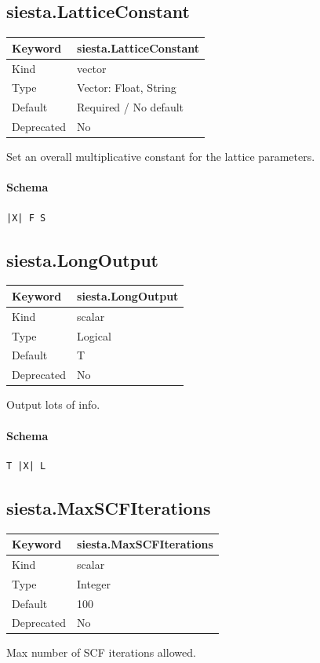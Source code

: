 \documentclass[11pt]{article}
\begin{document}
{{{{{\subsection{siesta.LatticeConstant}
\label{kw:siesta-LatticeConstant}
\begin{longtable}{|p{1.5in}|p{4.5in}|}
\hline
Keyword & siesta.LatticeConstant \\
\hline
Kind & vector \\
\hline
Type & Vector: Float, String \\
\hline
Default & Required / No default \\
\hline
Deprecated & No \\
\hline
\end{longtable}
 Set an overall multiplicative constant for the lattice parameters.

\paragraph{Schema}
\begin{Verbatim}
|X| F S
\end{Verbatim}

\subsection{siesta.LongOutput}
\label{kw:siesta-LongOutput}
\begin{longtable}{|p{1.5in}|p{4.5in}|}
\hline
Keyword & siesta.LongOutput \\
\hline
Kind & scalar \\
\hline
Type & Logical \\
\hline
Default & T \\
\hline
Deprecated & No \\
\hline
\end{longtable}
 Output lots of info.

\paragraph{Schema}
\begin{Verbatim}
T |X| L
\end{Verbatim}

\subsection{siesta.MaxSCFIterations}
\label{kw:siesta-MaxSCFIterations}
\begin{longtable}{|p{1.5in}|p{4.5in}|}
\hline
Keyword & siesta.MaxSCFIterations \\
\hline
Kind & scalar \\
\hline
Type & Integer \\
\hline
Default & 100 \\
\hline
Deprecated & No \\
\hline
\end{longtable}
 Max number of SCF iterations allowed.

}}}}}
\end{document}
